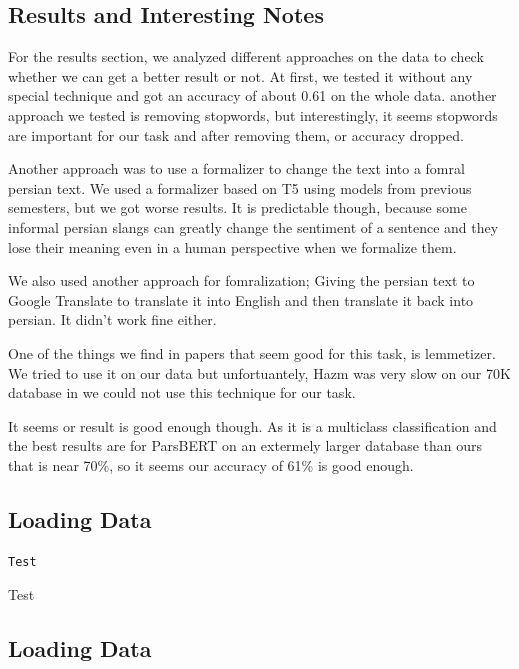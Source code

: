 \documentclass{solutionclass} %
\begin{document}
\subsection{Results and Interesting Notes}

For the results section, we analyzed different approaches on the data to check whether we can get a better result or not. At first, we tested it without any special technique and got an accuracy of about 0.61 on the whole data. another approach we tested is removing stopwords, but interestingly, it seems stopwords are important for our task and after removing them, or accuracy dropped.


Another approach was to use a formalizer to change the text into a fomral persian text. We used a formalizer based on T5 using models from previous semesters, but we got worse results. It is predictable though, because some informal persian slangs can greatly change the sentiment of a sentence and they lose their meaning even in a human perspective when we formalize them.

We also used another approach for fomralization; Giving the persian text to Google Translate to translate it into English and then translate it back into persian. It didn't work fine either.

One of the things we find in papers that seem good for this task, is lemmetizer. We tried to use it on our data but unfortuantely, Hazm was very slow on our 70K database in we could not use this technique for our task.

It seems or result is good enough though. As it is a multiclass classification and the best results are for ParsBERT on an extermely larger database than ours that is near 70\%, so it seems our accuracy of 61\% is good enough.



\subsection*{Loading Data}


\begin{lstlisting}[language=Python]
	Test
\end{lstlisting}

\begin{solution}
	Test
\end{solution}



\subsection*{Loading Data}
\end{document}
